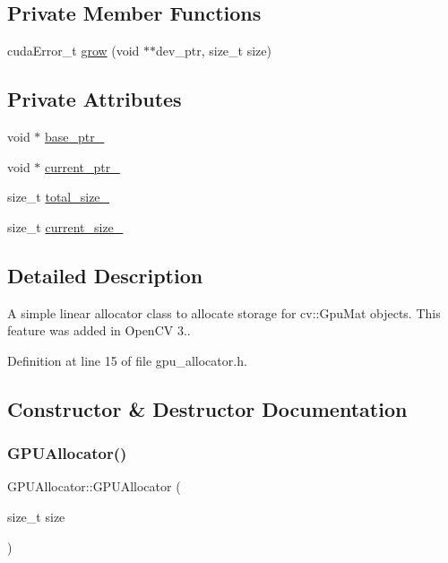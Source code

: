 \subsection*{Private Member Functions}
\begin{DoxyCompactItemize}
\item 
cuda\+Error\+\_\+t \mbox{\hyperlink{class_g_p_u_allocator_a04e2127f194094b27fe2351551c7ddeb}{grow}} (void $\ast$$\ast$dev\+\_\+ptr, size\+\_\+t size)
\end{DoxyCompactItemize}
\subsection*{Private Attributes}
\begin{DoxyCompactItemize}
\item 
void $\ast$ \mbox{\hyperlink{class_g_p_u_allocator_a3c2b70c86a428b4265771f9845307d0a}{base\+\_\+ptr\+\_\+}}
\item 
void $\ast$ \mbox{\hyperlink{class_g_p_u_allocator_a34ef0b84f1e5a510c4c968889b2dbf04}{current\+\_\+ptr\+\_\+}}
\item 
size\+\_\+t \mbox{\hyperlink{class_g_p_u_allocator_a629bd3cca49d00f82cd6538e0d07d4ae}{total\+\_\+size\+\_\+}}
\item 
size\+\_\+t \mbox{\hyperlink{class_g_p_u_allocator_a8d404f40928c431ced08c013189c8c58}{current\+\_\+size\+\_\+}}
\end{DoxyCompactItemize}


\subsection{Detailed Description}
A simple linear allocator class to allocate storage for cv\+::\+Gpu\+Mat objects. This feature was added in Open\+CV 3.. 

Definition at line 15 of file gpu\+\_\+allocator.\+h.



\subsection{Constructor \& Destructor Documentation}
\mbox{\label{class_g_p_u_allocator_aa98cb14ed329cc0dfd99982da0d9b671}} 
\subsubsection{\texorpdfstring{G\+P\+U\+Allocator()}{GPUAllocator()}}
{\footnotesize\ttfamily G\+P\+U\+Allocator\+::\+G\+P\+U\+Allocator (\begin{DoxyParamCaption}\item[{size\+\_\+t}]{size }\end{DoxyParamCaption})}



